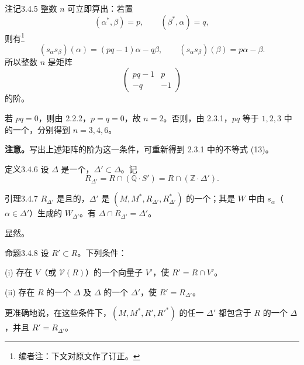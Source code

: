 \begin{SGAresult}{注记}{3.4.5}
整数 $n$ 可立即算出：若置
\[(\alpha^*,\beta)=p,\qquad(\beta^*,\alpha)=q,\]
则有\footnote{编者注：下文对原文作了订正。}
\[(s_\alpha s_\beta)(\alpha)=(pq-1)\alpha-q\beta,\qquad(s_\alpha s_\beta)(\beta)=p\alpha-\beta.\]
所以整数 $n$ 是矩阵
\[\begin{pmatrix}pq-1&p\\-q&-1\end{pmatrix}\]
的阶。

若 $pq=0$，则由 2.2.2，$p=q=0$，故 $n=2$。否则，由 2.3.1，$pq$ 等于 $1,2,3$ 中的一个，分别得到 $n=3,4,6$。

\textbf{注意。}写出上述矩阵的阶为这一条件，可重新得到 2.3.1 中的不等式 (13)。
\end{SGAresult}
\begin{SGAresult}{定义}{3.4.6}
设 $\Delta$ 是一个，$\Delta'\subset\Delta$。记
\[R_{\Delta'}=R\cap(\mathbb Q\cdot S')=R\cap(\mathbb Z\cdot\Delta').\]
\end{SGAresult}
\begin{SGAresult}{引理}{3.4.7}
$R_{\Delta'}$ 是且的，$\Delta'$ 是 $(M,M^*,R_{\Delta'},R_{\Delta'}^*)$ 的一个；其是 $W$ 中由 $s_\alpha$（$\alpha\in\Delta'$）生成的 $W_{\Delta'}$。有 $\Delta\cap R_{\Delta'}=\Delta'$。
\end{SGAresult}
显然。
\begin{SGAresult}{命题}{3.4.8}
设 $R'\subset R$。下列条件：

(i) 存在 $V$（或 $\mathscr V(R)$）的一个向量子 $V'$，使 $R'=R\cap V'$。

(ii) 存在 $R$ 的一个 $\Delta$ 及 $\Delta$ 的一个 $\Delta'$，使 $R'=R_{\Delta'}$。

更准确地说，在这些条件下，$(M,M^*,R',R'^*)$ 的任一 $\Delta'$ 都包含于 $R$ 的一个 $\Delta$，并且 $R'=R_{\Delta'}$。
\end{SGAresult}
